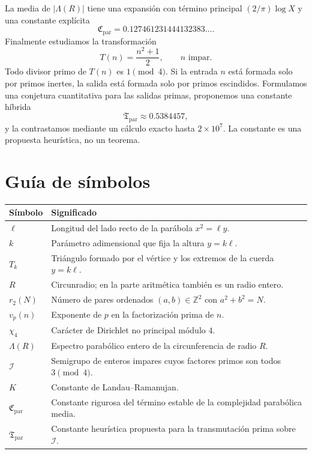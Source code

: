 \documentclass[11pt,a4paper,openany]{report}
\newcommand{\Z}{\mathbb{Z}}
\newcommand{\Iset}{\mathcal{I}}
\newcommand{\Lam}{\Lambda}
\begin{document}
La media de \(|\Lam(R)|\) tiene una expansión con término principal \((2/\pi)\log X\) y una constante explícita
\[
 \mathfrak C_{\mathrm{par}}=0.127461231444132383\ldots.
\]
Finalmente estudiamos la transformación
\[
 T(n)=\frac{n^2+1}{2},\qquad n\text{ impar}.
\]
Todo divisor primo de \(T(n)\) es \(1\pmod4\). Si la entrada \(n\) está formada solo por primos inertes, la salida está formada solo por primos escindidos. Formulamos una conjetura cuantitativa para las salidas primas, proponemos una constante híbrida
\[
 \mathfrak T_{\mathrm{par}}\approx0.5384457,
\]
y la contrastamos mediante un cálculo exacto hasta \(2\times10^7\). La constante es una propuesta heurística, no un teorema.

\tableofcontents
\listoffigures
\listoftables

\chapter*{Guía de símbolos}
\begin{longtable}{>{\raggedright\arraybackslash}p{3cm}p{10.5cm}}
\toprule
Símbolo & Significado\\
\midrule
\endhead
\(\ell\) & Longitud del lado recto de la parábola \(x^2=\ell y\).\\
\(k\) & Parámetro adimensional que fija la altura \(y=k\ell\).\\
\(T_k\) & Triángulo formado por el vértice y los extremos de la cuerda \(y=k\ell\).\\
\(R\) & Circunradio; en la parte aritmética también es un radio entero.\\
\(r_2(N)\) & Número de pares ordenados \((a,b)\in\Z^2\) con \(a^2+b^2=N\).\\
\(v_p(n)\) & Exponente de \(p\) en la factorización prima de \(n\).\\
\(\chi_4\) & Carácter de Dirichlet no principal módulo \(4\).\\
\(\Lam(R)\) & Espectro parabólico entero de la circunferencia de radio \(R\).\\
\(\Iset\) & Semigrupo de enteros impares cuyos factores primos son todos \(3\pmod4\).\\
\(K\) & Constante de Landau--Ramanujan.\\
\(\mathfrak C_{\mathrm{par}}\) & Constante rigurosa del término estable de la complejidad parabólica media.\\
\(\mathfrak T_{\mathrm{par}}\) & Constante heurística propuesta para la transmutación prima sobre \(\Iset\).\\
\bottomrule
\end{longtable}
\end{document}
